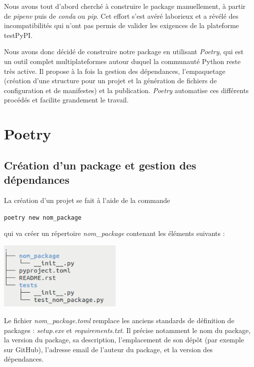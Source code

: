 \documentclass[twoside,a4paper,11pt,frenchb,openany]{report}
\begin{document}
Nous avons tout d'abord cherché à construire le package manuellement, à partir de \textit{pipenv} puis de \textit{conda} ou \textit{pip}. Cet effort s'est avéré laborieux et a révélé des incompatibilités qui n'ont pas permis de valider les exigences de la plateforme testPyPI.

Nous avons donc décidé de construire notre package en utilisant \textit{Poetry}, qui est un outil complet multiplateformes autour duquel la communauté Python reste très active. Il propose à la fois la gestion des dépendances, l'empaquetage (création d'une structure pour un projet et la génération de fichiers de configuration et de manifestes) et la publication. \textit{Poetry} automatise ces différents procédés et facilite grandement le travail. 
	

\section{Poetry}


\subsection{Création d'un package et gestion des dépendances}

La création d'un projet se fait à l'aide de la commande
\begin{tcolorbox}\texttt{poetry new nom\_package}\end{tcolorbox}
qui va créer un répertoire \textit{nom\_package} contenant les éléments suivants :

\includegraphics[width=6cm]{nom_package_tree.png}

Le fichier \textit{nom\_package.toml} remplace les anciens standards de définition de packages : \textit{setup.exe} et \textit{requirements.txt}. Il précise notamment le nom du package, la version du package, sa description, l’emplacement de son dépôt (par exemple sur GitHub), l’adresse email de l’auteur du package, et la version des dépendances.
\end{document}
